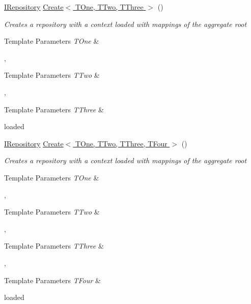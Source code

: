 \begin{DoxyCompactItemize}
\hyperlink{interface_highway_1_1_data_1_1_interfaces_1_1_i_repository}{I\-Repository} \hyperlink{class_highway_1_1_data_1_1_entity_framework_1_1_factory_1_1_repository_factory_a1de27f1264d65c2927bdc6dc02329a27}{Create$<$ T\-One, T\-Two, T\-Three $>$} ()
\begin{DoxyCompactList}\small\item\em Creates a repository with a context loaded with mappings of the aggregate root 
\begin{DoxyTemplParams}{Template Parameters}
{\em T\-One} & \\
\hline
\end{DoxyTemplParams}
,
\begin{DoxyTemplParams}{Template Parameters}
{\em T\-Two} & \\
\hline
\end{DoxyTemplParams}
,
\begin{DoxyTemplParams}{Template Parameters}
{\em T\-Three} & \\
\hline
\end{DoxyTemplParams}
loaded \end{DoxyCompactList}\item 
\hyperlink{interface_highway_1_1_data_1_1_interfaces_1_1_i_repository}{I\-Repository} \hyperlink{class_highway_1_1_data_1_1_entity_framework_1_1_factory_1_1_repository_factory_a7299e0d5fdaf1ceceaf7fbac1d010816}{Create$<$ T\-One, T\-Two, T\-Three, T\-Four $>$} ()
\begin{DoxyCompactList}\small\item\em Creates a repository with a context loaded with mappings of the aggregate root 
\begin{DoxyTemplParams}{Template Parameters}
{\em T\-One} & \\
\hline
\end{DoxyTemplParams}
,
\begin{DoxyTemplParams}{Template Parameters}
{\em T\-Two} & \\
\hline
\end{DoxyTemplParams}
,
\begin{DoxyTemplParams}{Template Parameters}
{\em T\-Three} & \\
\hline
\end{DoxyTemplParams}
,
\begin{DoxyTemplParams}{Template Parameters}
{\em T\-Four} & \\
\hline
\end{DoxyTemplParams}
loaded \end{DoxyCompactList}\end{DoxyCompactItemize}


